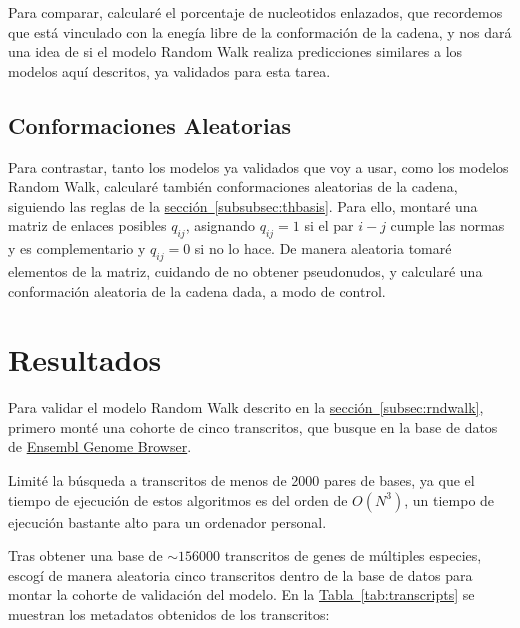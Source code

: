 \documentclass[a4paper,11pt,titlepage]{article}
\newcommand{\nr}[2][sección]{\hyperref[#2]{#1~\ref{#2}}}
\theoremstyle{definition}
\begin{document}
Para comparar, calcularé el porcentaje de nucleotidos enlazados, que recordemos que está vinculado con la enegía libre de la conformación de la cadena, y nos dará una idea de si el modelo Random Walk realiza predicciones similares a los modelos aquí descritos, ya validados para esta tarea.

\subsection{Conformaciones Aleatorias}\label{subsec:randomconf}

Para contrastar, tanto los modelos ya validados que voy a usar, como los modelos Random Walk, calcularé también conformaciones aleatorias de la cadena, siguiendo las reglas de la \nr[sección]{subsubsec:thbasis}. Para ello, montaré una matriz de enlaces posibles $q_{ij}$, asignando $q_{ij} = 1$ si el par $i-j$ cumple las normas y es complementario y $q_{ij} = 0$ si no lo hace. De manera aleatoria tomaré elementos de la matriz, cuidando de no obtener pseudonudos, y calcularé una conformación aleatoria de la cadena dada, a modo de control.

\newpage
\section{Resultados}\label{sec:res}

Para validar el modelo Random Walk descrito en la \nr[sección]{subsec:rndwalk}, primero monté una cohorte de cinco transcritos, que busque en la base de datos de \href{https://www.ensembl.org/index.html}{Ensembl Genome Browser}. %

Limité la búsqueda a transcritos de menos de 2000 pares de bases, ya que el tiempo de ejecución de estos algoritmos es del orden de $O(N^3)$, un tiempo de ejecución bastante alto para un ordenador personal.

Tras obtener una base de $\sim156000$ transcritos de genes de múltiples especies, escogí de manera aleatoria cinco transcritos dentro de la base de datos para montar la cohorte de validación del modelo. En la \nr[Tabla]{tab:transcripts} se muestran los metadatos obtenidos de los transcritos:
\end{document}
